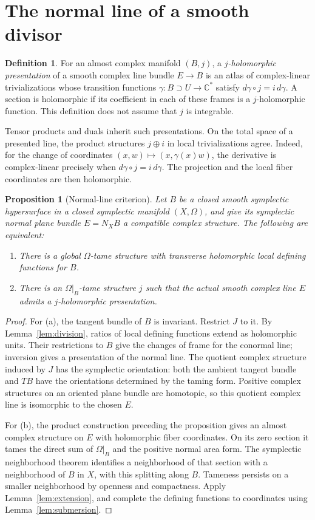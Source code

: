 \documentclass[11pt]{article}
\newtheorem{proposition}[theorem]{Proposition}
\theoremstyle{definition}
\newtheorem{definition}[theorem]{Definition}
\theoremstyle{remark}
\newcommand{\C}{\mathbb C}
\begin{document}
\section{The normal line of a smooth divisor}\label{sec:normal}

\begin{definition}
For an almost complex manifold $(B,j)$, a \emph{$j$-holomorphic presentation} of a smooth complex line bundle $E\to B$ is an atlas of complex-linear trivializations whose transition functions $\gamma:B\supset U\to\C^*$ satisfy $d\gamma\circ j=i\,d\gamma$. A section is holomorphic if its coefficient in each of these frames is a $j$-holomorphic function. This definition does not assume that $j$ is integrable.
\end{definition}
Tensor products and duals inherit such presentations. On the total space of a presented line, the product structures $j\oplus i$ in local trivializations agree. Indeed, for the change of coordinates
$(x,w)\mapsto(x,\gamma(x)w)$, the derivative is complex-linear precisely when $d\gamma\circ j=i\,d\gamma$. The projection and the local fiber coordinates are then holomorphic.

\begin{proposition}[Normal-line criterion]\label{prop:normal}
Let $B$ be a closed smooth symplectic hypersurface in a closed symplectic manifold $(X,\Omega)$, and give its symplectic normal plane bundle $E=N_XB$ a compatible complex structure. The following are equivalent:
\begin{enumerate}[label=(\alph*),leftmargin=*]
\item There is a global $\Omega$-tame structure with transverse holomorphic local defining functions for $B$.
\item There is an $\Omega|_B$-tame structure $j$ such that the actual smooth complex line $E$ admits a $j$-holomorphic presentation.
\end{enumerate}
\end{proposition}
\begin{proof}
For (a), the tangent bundle of $B$ is invariant. Restrict $J$ to it. By Lemma~\ref{lem:division}, ratios of local defining functions extend as holomorphic units. Their restrictions to $B$ give the changes of frame for the conormal line; inversion gives a presentation of the normal line. The quotient complex structure induced by $J$ has the symplectic orientation: both the ambient tangent bundle and $TB$ have the orientations determined by the taming form. Positive complex structures on an oriented plane bundle are homotopic, so this quotient complex line is isomorphic to the chosen $E$.

For (b), the product construction preceding the proposition gives an almost complex structure on $E$ with holomorphic fiber coordinates. On its zero section it tames the direct sum of $\Omega|_B$ and the positive normal area form. The symplectic neighborhood theorem identifies a neighborhood of that section with a neighborhood of $B$ in $X$, with this splitting along $B$. Tameness persists on a smaller neighborhood by openness and compactness. Apply Lemma~\ref{lem:extension}, and complete the defining functions to coordinates using Lemma~\ref{lem:submersion}.
\end{proof}
\end{document}
